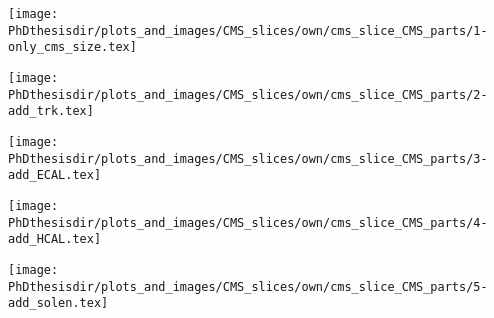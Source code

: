 \begin{frame}
\transdissolve
{}
\end{frame}

\begin{frame}
\transwipe
{}
\begin{center}
\texttt{[image: \\PhDthesisdir/plots\_and\_images/CMS\_slices/own/cms\_slice\_CMS\_parts/1-only\_cms\_size.tex]}
\end{center}
\end{frame}

\begin{frame}
\addtocounter{framenumber}{-1}
\transdissolve[duration=2]
\begin{center}
\texttt{[image: \\PhDthesisdir/plots\_and\_images/CMS\_slices/own/cms\_slice\_CMS\_parts/2-add\_trk.tex]}
\end{center}
\end{frame}

\begin{frame}
\addtocounter{framenumber}{-1}
\transdissolve[duration=2]
\begin{center}
\texttt{[image: \\PhDthesisdir/plots\_and\_images/CMS\_slices/own/cms\_slice\_CMS\_parts/3-add\_ECAL.tex]}
\end{center}
\end{frame}

\begin{frame}
\addtocounter{framenumber}{-1}
\transdissolve[duration=2]
\begin{center}
\texttt{[image: \\PhDthesisdir/plots\_and\_images/CMS\_slices/own/cms\_slice\_CMS\_parts/4-add\_HCAL.tex]}
\end{center}
\end{frame}

\begin{frame}
\addtocounter{framenumber}{-1}
\transdissolve[duration=2]
\begin{center}
\texttt{[image: \\PhDthesisdir/plots\_and\_images/CMS\_slices/own/cms\_slice\_CMS\_parts/5-add\_solen.tex]}
\end{center}
\end{frame}

